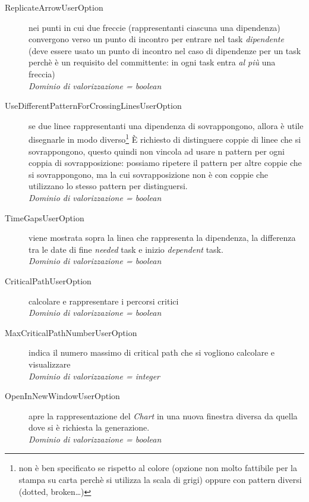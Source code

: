 \begin{description}
\begin{description}
	\item[ReplicateArrowUserOption] nei punti in cui due freccie (rappresentanti
	ciascuna una dipendenza) convergono verso un punto di incontro per
 entrare nel task \emph{dipendente} (deve essere usato un punto di incontro nel
 caso di dipendenze per un task perch\`e \`e un requisito del committente: in
 ogni task entra \emph{al pi\`u} una freccia) 
 	\\ \emph{Dominio di valorizzazione = boolean}
 	\item[UseDifferentPatternForCrossingLinesUserOption] se due linee
 	rappresentanti una dipendenza di sovrappongono, allora \`e utile disegnarle
 	in modo diverso\footnote{non \`e ben specificato se rispetto al colore
 	(opzione non molto fattibile per la stampa su carta perch\`e si utilizza la
 	scala di grigi) oppure con pattern diversi (dotted, broken\ldots)} \`E
 	richiesto di distinguere coppie di linee che si sovrappongono, questo quindi
 	non vincola ad usare n pattern per ogni coppia di sovrapposizione: possiamo
 	ripetere il pattern per altre coppie che si sovrappongono, ma la cui
 	sovrapposizione non \`e con coppie che utilizzano lo stesso pattern per
 	distinguersi.
 	\\ \emph{Dominio di valorizzazione = boolean}
 	\item[TimeGapsUserOption] viene mostrata sopra la linea che rappresenta
 	la dipendenza, la differenza tra le date di fine \emph{needed} task e inizio
 	\emph{dependent} task.
 	\\ \emph{Dominio di valorizzazione = boolean}
 	\item[CriticalPathUserOption] calcolare e rappresentare i percorsi critici
 	\\ \emph{Dominio di valorizzazione = boolean}
 	\item[MaxCriticalPathNumberUserOption] indica il numero massimo di critical
 	path che si vogliono calcolare e visualizzare
 	\\ \emph{Dominio di valorizzazione = integer}
 	\item[OpenInNewWindowUserOption] apre la rappresentazione del \emph{Chart} in
 	una nuova finestra diversa da quella dove si \`e richiesta la generazione.
 	\\ \emph{Dominio di valorizzazione = boolean}
  \end{description}


\end{description}
